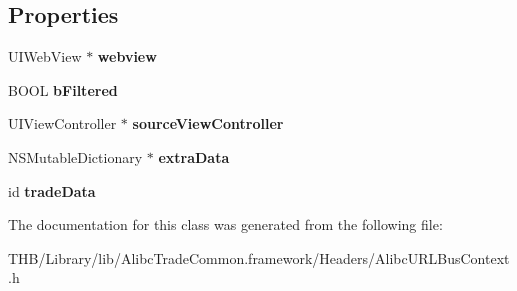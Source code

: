 \subsection*{Properties}
\begin{DoxyCompactItemize}
\item 
\mbox{\label{interface_alibc_u_r_l_bus_context_af2e797230cfc77cca18cdc8bc5205a92}} 
U\+I\+Web\+View $\ast$ {\bfseries webview}
\item 
\mbox{\label{interface_alibc_u_r_l_bus_context_a77b574821d793b4bd6a69125f005cdad}} 
B\+O\+OL {\bfseries b\+Filtered}
\item 
\mbox{\label{interface_alibc_u_r_l_bus_context_a8151f316bb09a0eb72d6bb1a93684a61}} 
U\+I\+View\+Controller $\ast$ {\bfseries source\+View\+Controller}
\item 
\mbox{\label{interface_alibc_u_r_l_bus_context_a07fa812d4ee4bd0e4545de7c87f34352}} 
N\+S\+Mutable\+Dictionary $\ast$ {\bfseries extra\+Data}
\item 
\mbox{\label{interface_alibc_u_r_l_bus_context_a3611bb06d90bdfb131a8cecb67908656}} 
id {\bfseries trade\+Data}
\end{DoxyCompactItemize}


The documentation for this class was generated from the following file\+:\begin{DoxyCompactItemize}
\item 
T\+H\+B/\+Library/lib/\+Alibc\+Trade\+Common.\+framework/\+Headers/Alibc\+U\+R\+L\+Bus\+Context.\+h\end{DoxyCompactItemize}
